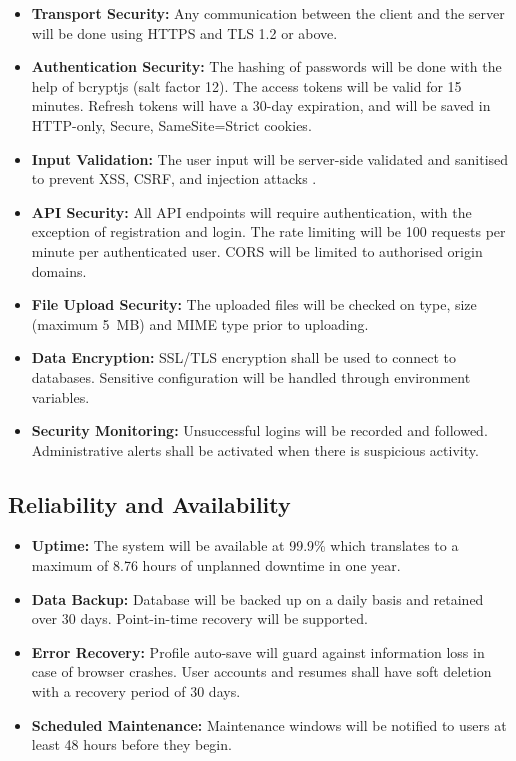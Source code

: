 \documentclass[12pt, a4paper, oneside]{report}
\begin{document}
\begin{itemize}
    \item \textbf{Transport Security:} Any communication between the client and the server will be done using HTTPS and TLS 1.2 or above.
    \item \textbf{Authentication Security:} The hashing of passwords will be done with the help of bcryptjs \cite{bcrypt1999} (salt factor 12). The access tokens will be valid for 15 minutes. Refresh tokens will have a 30-day expiration, and will be saved in HTTP-only, Secure, SameSite=Strict cookies.
    \item \textbf{Input Validation:} The user input will be server-side validated and sanitised to prevent XSS, CSRF, and injection attacks \cite{owasp2021}.
    \item \textbf{API Security:} All API endpoints will require authentication, with the exception of registration and login. The rate limiting will be 100 requests per minute per authenticated user. CORS will be limited to authorised origin domains.
    \item \textbf{File Upload Security:} The uploaded files will be checked on type, size (maximum 5~MB) and MIME type prior to uploading.
    \item \textbf{Data Encryption:} SSL/TLS encryption shall be used to connect to databases. Sensitive configuration will be handled through environment variables.
    \item \textbf{Security Monitoring:} Unsuccessful logins will be recorded and followed. Administrative alerts shall be activated when there is suspicious activity.
\end{itemize}

\subsection{Reliability and Availability}

\begin{itemize}
    \item \textbf{Uptime:} The system will be available at 99.9\% which translates to a maximum of 8.76 hours of unplanned downtime in one year.
    \item \textbf{Data Backup:} Database will be backed up on a daily basis and retained over 30 days. Point-in-time recovery will be supported.
    \item \textbf{Error Recovery:} Profile auto-save will guard against information loss in case of browser crashes. User accounts and resumes shall have soft deletion with a recovery period of 30 days.
    \item \textbf{Scheduled Maintenance:} Maintenance windows will be notified to users at least 48 hours before they begin.
\end{itemize}
\end{document}
